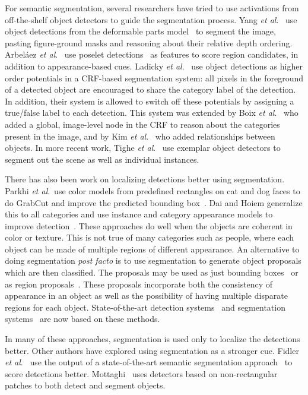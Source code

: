 \documentclass[runningheads]{llncs}
\newcommand\etal{\emph{et al}.\ }
\begin{document}
For semantic segmentation, several researchers have tried to use activations from off-the-shelf object detectors to guide the segmentation process. Yang \etal\cite{YangTPAMI12} use object detections from the deformable parts model~\cite{FelzenszwalbPAMI10} to segment the image, pasting figure-ground masks and reasoning about their relative depth ordering. Arbel\'{a}ez \etal\cite{ArbelaezCVPR12} use poselet detections~\cite{BourdevECCV10} as features to score region candidates, in addition to appearance-based cues. Ladicky \etal\cite{LadickyECCV10} use object detections as higher order potentials in a CRF-based segmentation system: all pixels in the foreground of a detected object are encouraged to share the category label of the detection. In addition, their system is allowed to switch off these potentials by assigning a true/false label to each detection. This system was extended by Boix \etal\cite{BoixIJCV12} who added a global, image-level node in the CRF to reason about the categories present in the image, and by Kim \etal\cite{KimECCV12W} who added relationships between objects. In more recent work, Tighe \etal\cite{TigheCVPR14} use exemplar object detectors to segment out the scene as well as individual instances. 

 There has also been work on localizing detections better using segmentation. Parkhi \etal use color models from predefined rectangles on cat and dog faces to do GrabCut and improve the predicted bounding box~\cite{ParkhiICCV11}. Dai and Hoiem generalize this to all categories and use instance and category appearance models to improve detection~\cite{DaiCVPR12}. These approaches do well when the objects are coherent in color or texture. This is not true of many categories such as people, where each object can be made of multiple regions of different appearance. An alternative to doing segmentation \emph{post facto} is to use segmentation to generate object proposals which are then classified. The proposals may be used as just bounding boxes~\cite{VanICCV11} or as region proposals~\cite{CarreiraCVPR10,ArbelaezCVPR14}. These proposals incorporate both the consistency of appearance in an object as well as the possibility of having multiple disparate regions for each object. State-of-the-art detection systems~\cite{GirshickCVPR14} and segmentation systems~\cite{CarreiraECCV12} are now based on these methods. 

In many of these approaches, segmentation is used only to localize the detections better. Other authors have explored using segmentation as a stronger cue. Fidler \etal\cite{FidlerCVPR13} use the output of a state-of-the-art semantic segmentation approach~\cite{CarreiraECCV12} to score detections better. Mottaghi~\cite{MottaghiCVPR12} uses detectors based on non-rectangular patches to both detect and segment objects.
\end{document}
